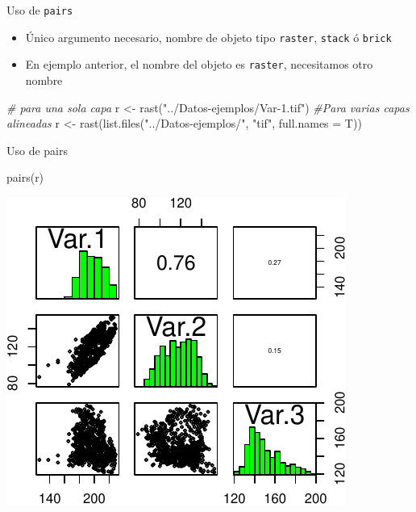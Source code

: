 \documentclass[
  11pt,
  ignorenonframetext,
]{beamer}
\newenvironment{Shaded}{}{}
\newcommand{\AttributeTok}[1]{\textcolor[rgb]{0.49,0.56,0.16}{#1}}
\newcommand{\CommentTok}[1]{\textcolor[rgb]{0.38,0.63,0.69}{\textit{#1}}}
\newcommand{\FunctionTok}[1]{\textcolor[rgb]{0.02,0.16,0.49}{#1}}
\newcommand{\NormalTok}[1]{#1}
\newcommand{\OtherTok}[1]{\textcolor[rgb]{0.00,0.44,0.13}{#1}}
\newcommand{\StringTok}[1]{\textcolor[rgb]{0.25,0.44,0.63}{#1}}
\begin{document}
\begin{frame}[fragile]{Uso de \texttt{pairs}}
\protect\hypertarget{uso-de-pairs}{}
\begin{itemize}
\item
  Único argumento necesario, nombre de objeto tipo \texttt{raster},
  \texttt{stack} ó \texttt{brick}
\item
  En ejemplo anterior, el nombre del objeto es \texttt{raster},
  necesitamos otro nombre
\end{itemize}

\begin{Shaded}
\begin{Highlighting}[]
\CommentTok{\# para una sola capa}
\NormalTok{r }\OtherTok{\textless{}{-}} \FunctionTok{rast}\NormalTok{(}\StringTok{"../Datos{-}ejemplos/Var{-}1.tif"}\NormalTok{) }
\CommentTok{\#Para varias capas alineadas}
\NormalTok{r }\OtherTok{\textless{}{-}} \FunctionTok{rast}\NormalTok{(}\FunctionTok{list.files}\NormalTok{(}\StringTok{"../Datos{-}ejemplos/"}\NormalTok{, }
                      \StringTok{"tif"}\NormalTok{, }\AttributeTok{full.names =}\NormalTok{ T))}
\end{Highlighting}
\end{Shaded}
\end{frame}

\begin{frame}[fragile]{Uso de pairs}
\protect\hypertarget{uso-de-pairs-1}{}
\begin{Shaded}
\begin{Highlighting}[]
\FunctionTok{pairs}\NormalTok{(r)}
\end{Highlighting}
\end{Shaded}

\begin{center}\includegraphics{Correlacion-espacial_files/figure-beamer/unnamed-chunk-6-1} \end{center}
\end{frame}
\end{document}
